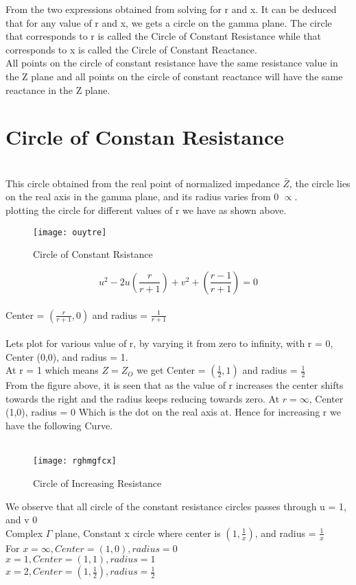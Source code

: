 From the two expressions obtained from solving for r and x.  It can be deduced that for any value of r and x, we gets a circle on the gamma plane. The circle that corresponds to r is called the Circle of Constant Resistance while that corresponds to x is called the Circle of Constant Reactance.\\

All points on the circle of constant resistance have the same resistance value in the Z plane and all points on the  circle of constant reactance will have the same reactance in the Z plane.\\

\section{Circle of Constan Resistance}\\ 
This circle  obtained from the real point of normalized impedance $ \bar{Z} $, the circle lies on the real axis in the gamma plane, and its radius varies from 0 $\propto$.\\ plotting the circle for different values of r we have as shown above.
\begin{figure}[h]
	\centering
	\texttt{[image: ouytre]}
	\caption{Circle of Constant Rsistance}
	\label{fig:ouytre}
\end{figure}
\begin{equation*}
u^2 - 2u(\frac{r}{r + 1}) + v^2 +(\frac{r - 1}{r + 1}) = 0
\end{equation*}\\
 Center = $(\frac{r}{r + 1},0)$ and radius = $\frac{1}{r + 1}$\\\\
Lets plot for various value of r, by varying it from zero to infinity, with r = 0, Center (0,0), and radius = 1.\\
At r = 1 which means $Z = Z_O$ we get  Center = $(\frac{1}{2},1)$ and radius = $\frac{1}{2}$\\
From the figure above, it is seen that as the value of r increases the center shifts towards the right and the radius keeps reducing towards zero. At $r = \infty$, Center (1,0), radius = 0 Which is the dot on the real axis at. Hence for increasing r we have the following Curve.\\\\
\begin{figure}[h]
	\centering
	\texttt{[image: rghmgfcx]}
	\caption{Circle of Increasing Resistance}
	\label{fig:rghmgfcx}
\end{figure}
We observe that all circle of the constant resistance circles passes through u = 1, and v  0\\
Complex $\Gamma$ plane, Constant x circle where center is $(1,\frac{1}{x})$, and radius = $\frac{1}{x}$\\
For $x = \infty,Center = (1,0), radius = 0$\\
 $x = 1,Center = (1,1), radius = 1$\\
  $x = 2,Center = (1,\frac{1}{2}), radius = \frac{1}{2}$\\
